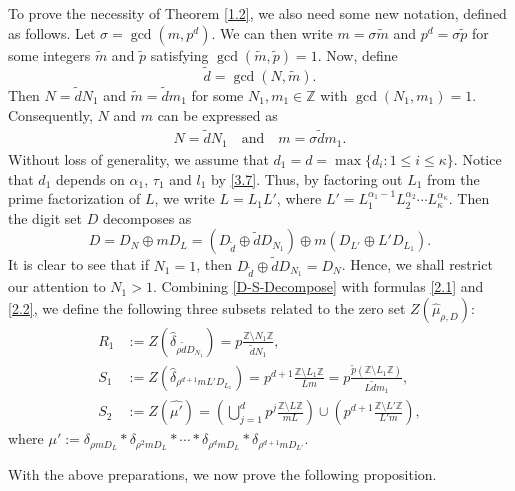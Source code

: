 \documentclass[11pt]{article}
\numberwithin{equation}{section}
\begin{document}
To prove the necessity of Theorem \ref{1.2}, we also need some new notation, defined as follows.  
Let $\sigma = \gcd(m, p^d)$. We can then write $m = \sigma \tilde{m}$ and  $p^d = \sigma \tilde{p}$ for some integers   $\tilde{m}$ and $\tilde{p}$ satisfying $\gcd(\tilde{m}, \tilde{p}) = 1$. Now, define
$$\tilde{d} = \gcd(N, \tilde{m}).$$ Then $N = \tilde{d} N_1$ and $\tilde{m} = \tilde{d} m_1$ for some $N_1, m_1 \in \mathbb{Z}$ with $\gcd(N_1, m_1) = 1$.
Consequently, $N$ and $m$ can be expressed as
\begin{align}\label{3.3}
N = \tilde{d} N_1 \quad \text{and} \quad m = \sigma \tilde{d} m_1.
\end{align}
Without loss of generality, we assume that $d_1=d=\max\{d_i : 1 \leq i \leq \kappa\}$. Notice that $d_1$ depends on $\alpha_1$, $\tau_1$ and $l_1$ by \eqref{3.7}. Thus, by factoring out $L_1$ from the prime factorization of $L$, we write $L = L_1 L'$, where $L' = L_1^{\alpha_1-1} L_2^{\alpha_2} \cdots L_\kappa^{\alpha_\kappa}$. Then the digit set $D$ decomposes as
\begin{equation}\label{D-S-Decompose}
D= D_N \oplus m D_L = \left(D_{\tilde{d}} \oplus \tilde{d} D_{N_1} \right) \oplus m \left( D_{L'} \oplus L' D_{L_1} \right).
\end{equation}
It is clear to see that if  $N_1=1$, then $D_{\tilde{d}} \oplus \tilde{d} D_{N_1}=D_N$. Hence, we shall restrict our attention to  $N_1>1$.
Combining \eqref{D-S-Decompose} with formulas \eqref{2.1} and \eqref{2.2}, we define the following three subsets related to the zero set $Z(\hat{\mu}_{\rho,D})$:
\begin{align}
	R_1 &:= Z(\hat{\delta}_{\rho \tilde{d}D_{N_1}})
	= p \frac{\mathbb{Z} \setminus N_1 \mathbb{Z}}{\tilde{d} N_1},
	\label{eq-R1} \\[0.5em]
	S_1 &:= Z(\hat{\delta}_{\rho^{d+1} mL'D_{L_1}})
=p^{d+1} \frac{\mathbb{Z} \setminus L_1 \mathbb{Z}}{L m}
=p \frac{\tilde{p} (\mathbb{Z} \setminus L_1 \mathbb{Z})}
	{L \tilde{d} m_1},
	\label{eq-S1} \\[0.5em]
	S_2 &:= Z(\widehat{\mu'})
	= \left( \bigcup_{j=1}^{d} p^j
	\frac{\mathbb{Z} \setminus L \mathbb{Z}}{m L} \right)
	\cup \left( p^{d+1}
	\frac{\mathbb{Z} \setminus L' \mathbb{Z}}{L' m} \right),
	\label{eq-S2}
\end{align}
where $\mu':=\delta_{\rho mD_L}*\delta_{\rho^2 mD_L}*\cdots*\delta_{\rho^d mD_L}*\delta_{\rho^{d+1}m D_{L'}}$.




\medskip
With the above preparations, we now prove the following proposition.
\end{document}
